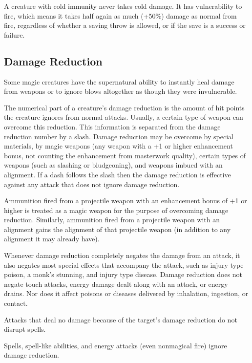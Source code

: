 A creature with cold immunity never takes cold damage. It has vulnerability to 
fire, which means it takes half again as much (+50\%) damage as normal from fire, 
regardless of whether a saving throw is allowed, or if the save is a success or 
failure.

\subsection{Damage Reduction}

Some magic creatures have the supernatural ability to instantly heal damage from 
weapons or to ignore blows altogether as though they were invulnerable.

The numerical part of a creature's damage reduction is the amount of hit points 
the creature ignores from normal attacks. Usually, a certain type of weapon can 
overcome this reduction. This information is separated from the damage reduction 
number by a slash. Damage reduction may be overcome by special materials, by magic 
weapons (any weapon with a +1 or higher enhancement bonus, not counting the enhancement 
from masterwork quality), certain types of weapons (such as slashing or bludgeoning), 
and weapons imbued with an alignment. If a dash follows the slash then the damage 
reduction is effective against any attack that does not ignore damage reduction.

Ammunition fired from a projectile weapon with an enhancement bonus of +1 or higher 
is treated as a magic weapon for the purpose of overcoming damage reduction. Similarly, 
ammunition fired from a projectile weapon with an alignment gains the alignment 
of that projectile weapon (in addition to any alignment it may already have).

Whenever damage reduction completely negates the damage from an attack, it also 
negates most special effects that accompany the attack, such as injury type poison, 
a monk's stunning, and injury type disease. Damage reduction does not negate touch 
attacks, energy damage dealt along with an attack, or energy drains. Nor does it 
affect poisons or diseases delivered by inhalation, ingestion, or contact. 

Attacks that deal no damage because of the target's damage reduction do not disrupt 
spells.

Spells, spell-like abilities, and energy attacks (even nonmagical fire) ignore 
damage reduction.

